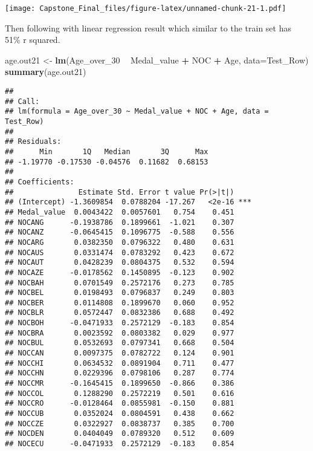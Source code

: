 \documentclass[]{article}
\newenvironment{Shaded}{\begin{snugshade}}{\end{snugshade}}
\newcommand{\KeywordTok}[1]{\textcolor[rgb]{0.13,0.29,0.53}{\textbf{#1}}}
\newcommand{\DataTypeTok}[1]{\textcolor[rgb]{0.13,0.29,0.53}{#1}}
\newcommand{\DecValTok}[1]{\textcolor[rgb]{0.00,0.00,0.81}{#1}}
\newcommand{\StringTok}[1]{\textcolor[rgb]{0.31,0.60,0.02}{#1}}
\newcommand{\OperatorTok}[1]{\textcolor[rgb]{0.81,0.36,0.00}{\textbf{#1}}}
\newcommand{\NormalTok}[1]{#1}
\begin{document}
\texttt{[image: Capstone\_Final\_files/figure-latex/unnamed-chunk-21-1.pdf]}

Then following with linear regression result which similar to the train
set has 51\% r squared.

\begin{Shaded}
\begin{Highlighting}[]
\NormalTok{age.out21 <-}\StringTok{ }\KeywordTok{lm}\NormalTok{(Age_over_}\DecValTok{30} \OperatorTok{~}\StringTok{ }\NormalTok{Medal_value }\OperatorTok{+}\StringTok{ }\NormalTok{NOC }\OperatorTok{+}\StringTok{ }\NormalTok{Age,}
               \DataTypeTok{data=}\NormalTok{Test_Row)}
\KeywordTok{summary}\NormalTok{(age.out21)}
\end{Highlighting}
\end{Shaded}

\begin{verbatim}
## 
## Call:
## lm(formula = Age_over_30 ~ Medal_value + NOC + Age, data = Test_Row)
## 
## Residuals:
##      Min       1Q   Median       3Q      Max 
## -1.19770 -0.17530 -0.04576  0.11682  0.68153 
## 
## Coefficients:
##               Estimate Std. Error t value Pr(>|t|)    
## (Intercept) -1.3609854  0.0788204 -17.267   <2e-16 ***
## Medal_value  0.0043422  0.0057601   0.754    0.451    
## NOCANG      -0.1938786  0.1899661  -1.021    0.307    
## NOCANZ      -0.0645415  0.1096775  -0.588    0.556    
## NOCARG       0.0382350  0.0796322   0.480    0.631    
## NOCAUS       0.0331474  0.0783292   0.423    0.672    
## NOCAUT       0.0428239  0.0804375   0.532    0.594    
## NOCAZE      -0.0178562  0.1450895  -0.123    0.902    
## NOCBAH       0.0701549  0.2572176   0.273    0.785    
## NOCBEL       0.0198493  0.0796837   0.249    0.803    
## NOCBER       0.0114808  0.1899670   0.060    0.952    
## NOCBLR       0.0572447  0.0832386   0.688    0.492    
## NOCBOH      -0.0471933  0.2572129  -0.183    0.854    
## NOCBRA       0.0023592  0.0803382   0.029    0.977    
## NOCBUL       0.0532693  0.0797341   0.668    0.504    
## NOCCAN       0.0097375  0.0782722   0.124    0.901    
## NOCCHI       0.0634532  0.0891904   0.711    0.477    
## NOCCHN       0.0229396  0.0798106   0.287    0.774    
## NOCCMR      -0.1645415  0.1899650  -0.866    0.386    
## NOCCOL       0.1288290  0.2572219   0.501    0.616    
## NOCCRO      -0.0128464  0.0855981  -0.150    0.881    
## NOCCUB       0.0352024  0.0804591   0.438    0.662    
## NOCCZE       0.0322927  0.0838737   0.385    0.700    
## NOCDEN       0.0404049  0.0789320   0.512    0.609    
## NOCECU      -0.0471933  0.2572129  -0.183    0.854    

\end{verbatim}
\end{document}

